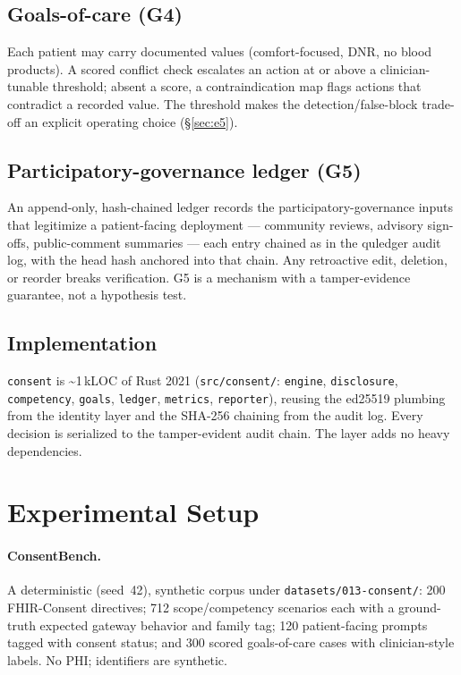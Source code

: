 \documentclass[11pt]{article}
\begin{document}
\subsection{Goals-of-care (G4)}
Each patient may carry documented values (comfort-focused, DNR, no blood products).
A scored conflict check escalates an action at or above a clinician-tunable
threshold; absent a score, a contraindication map flags actions that contradict a
recorded value. The threshold makes the detection/false-block trade-off an explicit
operating choice (\S\ref{sec:e5}).

\subsection{Participatory-governance ledger (G5)}
An append-only, hash-chained ledger records the participatory-governance inputs that
legitimize a patient-facing deployment --- community reviews, advisory sign-offs,
public-comment summaries --- each entry chained as in the quledger audit log, with the
head hash anchored into that chain. Any retroactive edit, deletion, or reorder
breaks verification. G5 is a mechanism with a tamper-evidence guarantee, not a
hypothesis test.

\subsection{Implementation}
\texttt{consent} is \textasciitilde1\,kLOC of Rust 2021 (\texttt{src/consent/}:
\texttt{engine}, \texttt{disclosure}, \texttt{competency}, \texttt{goals},
\texttt{ledger}, \texttt{metrics}, \texttt{reporter}), reusing the ed25519 plumbing
from the identity layer and the SHA-256 chaining from the audit log. Every decision
is serialized to the tamper-evident audit chain. The layer adds no heavy
dependencies.

\section{Experimental Setup}
\paragraph{ConsentBench.} A deterministic (seed~42), synthetic corpus under
\texttt{datasets/013-consent/}: 200 FHIR-Consent directives; 712 scope/competency
scenarios each with a ground-truth expected gateway behavior and family tag; 120
patient-facing prompts tagged with consent status; and 300 scored goals-of-care
cases with clinician-style labels. No PHI; identifiers are synthetic.
\end{document}
